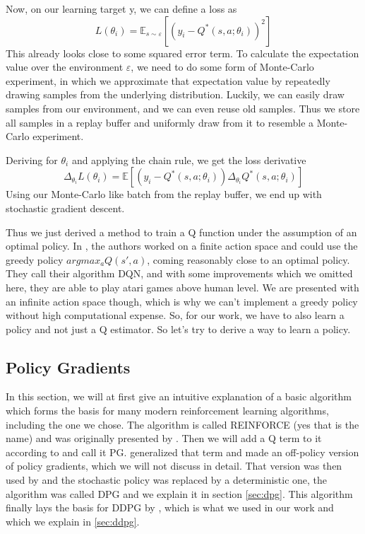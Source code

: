 \documentclass[hyperref,final,beleg]{cgvpub}
\begin{document}
Now, on our learning target y, we can define a loss as
\begin{equation}
L(\theta_i) = \mathbb{E}_{s \sim \varepsilon}[(y_i - Q^*(s, a;\theta_i))^2]
\end{equation}
This already looks close to some squared error term. To calculate the expectation value over the environment $\varepsilon$, we need to do some form of Monte-Carlo experiment, in which we approximate that expectation value by repeatedly drawing samples from the underlying distribution. Luckily, we can easily draw samples from our environment, and we can even reuse old samples. Thus we store all samples in a replay buffer and uniformly draw from it to resemble a Monte-Carlo experiment. 

Deriving for $\theta_i$ and applying the chain rule, we get the loss derivative
\begin{equation}
\Delta_{\theta_i} L(\theta_i) = \mathbb{E}[(y_i - Q^*(s, a;\theta_i))\Delta_{\theta_i}Q^*(s, a;\theta_i)]
\end{equation}
Using our Monte-Carlo like batch from the replay buffer, we end up with stochastic gradient descent.

Thus we just derived a method to train a Q function under the assumption of an optimal policy. In \cite{mnihPlayingAtariDeep2013}, the authors worked on a finite action space and could use the greedy policy $argmax_a Q(s', a)$, coming reasonably close to an optimal policy. They call their algorithm \ac{DQN}, and with some improvements which we omitted here, they are able to play atari games above human level. We are presented with an infinite action space though, which is why we can't implement a greedy policy without high computational expense. So, for our work, we have to also learn a policy and not just a Q estimator. So let's try to derive a way to learn a policy.


\subsection{Policy Gradients}

In this section, we will at first give an intuitive explanation of a basic algorithm which forms the basis for many modern reinforcement learning algorithms, including the one we chose. The algorithm is called \ac{REINFORCE} (yes that is the name) and was originally presented by \cite{williamsSimpleStatisticalGradientfollowing}. Then we will add a Q term to it according to \cite{suttonPolicyGradientMethods} and call it \ac{PG}. \cite{degrisOffPolicyActorCritic2013} generalized that term and made an off-policy version of policy gradients, which we will not discuss in detail. That version was then used by \cite{silverDeterministicPolicyGradient2013} and the stochastic policy was replaced by a deterministic one, the algorithm was called \ac{DPG} and we explain it in section \ref{sec:dpg}. This algorithm finally lays the basis for \ac{DDPG} by \cite{lillicrapCONTINUOUSCONTROLDEEP2015}, which is what we used in our work and which we explain in \ref{sec:ddpg}.
\end{document}
